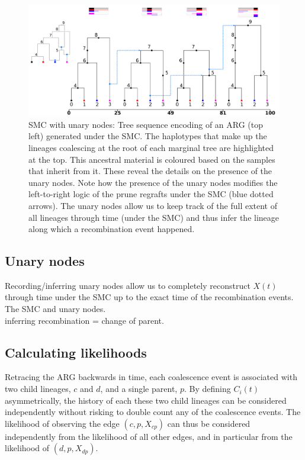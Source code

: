 \documentclass{article}
\begin{document}
\begin{figure}[!ht]
\centering
\includegraphics[width=\textwidth]{figures/smc-custom-haplotypes-mini.png}
\caption{SMC with unary nodes: Tree sequence encoding of an ARG (top left) 
generated under the SMC. The haplotypes that make up the lineages coalescing 
at the root of each marginal tree are highlighted at the top. This ancestral 
material is coloured based on the samples that inherit from it.
These reveal the details on the presence of the unary nodes. 
Note how the presence of the unary nodes 
modifies the left-to-right logic of the prune regrafts 
under the SMC (blue dotted arrows).
The unary nodes allow us to keep track of the full extent of all lineages 
through time (under the SMC) and thus infer the lineage along which a 
recombination event happened.}
\label{fig:smc-unary}
\end{figure}

\subsection{Unary nodes} \label{par:unary}

Recording/inferring unary nodes allow us to completely reconstruct 
$X(t)$ through time under the SMC up to the exact 
time of the recombination events. \\

The SMC and unary nodes. \\

inferring recombination = change of parent. \\


\subsection{Calculating likelihoods} \label{par:liks}

Retracing the ARG backwards in time, each coalescence event is associated with two child 
lineages, $c$ and $d$, and a single parent, $p$. By defining $C_i(t)$ asymmetrically, 
the history of each these two child lineages can be considered independently without 
risking to double count any of the coalescence events. The likelihood of 
observing the edge $(c, p, X_{cp})$ can thus be considered independently from 
the likelihood of all other edges, and in particular from the likelihood 
of $(d, p, X_{dp})$.\\
\end{document}
